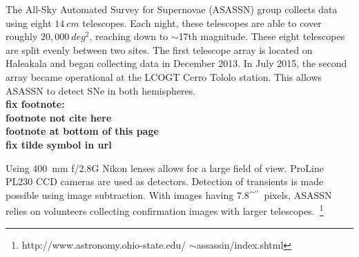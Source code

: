 \documentclass[aps,prb,twocolumn,superscriptaddress]{revtex4-1}
\def\arcsec{\ifmmode^{\prime\prime}\else$^{\prime\prime}$\fi}
\begin{document}
\indent The All-Sky Automated Survey for Supernovae (ASASSN) group 
collects data using eight $14~cm$ telescopes. Each night, these  
telescopes are able to cover roughly $20,000~deg^{2}$, reaching 
down to $\sim$17th magnitude.
These eight telescopes are split evenly between two sites.
The first telescope array is located on Haleakala and began 
collecting data in December 2013. In July 2015, the second %
array became operational at the LCOGT Cerro Tololo station. 
This allows ASASSN to detect SNe in both 
hemispheres.~\cite{asn_data}
~\\{\bf fix footnote:\\
\indent footnote not cite here\\
\indent footnote at bottom of this page\\
\indent fix tilde symbol in url
}



\indent Using 400~mm f/2.8G Nikon lenses allows for a large field of 
view. ProLine PL230 CCD cameras are used as detectors. Detection of 
transients is made possible using image subtraction. With images 
having 7.8\arcsec\ pixels, ASASSN relies on volunteers collecting  
confirmation images with 
larger telescopes.~\footnote{\label{foot:asn} http://www.astronomy.ohio-state.edu/ $\sim$assassin/index.shtml}
\end{document}
